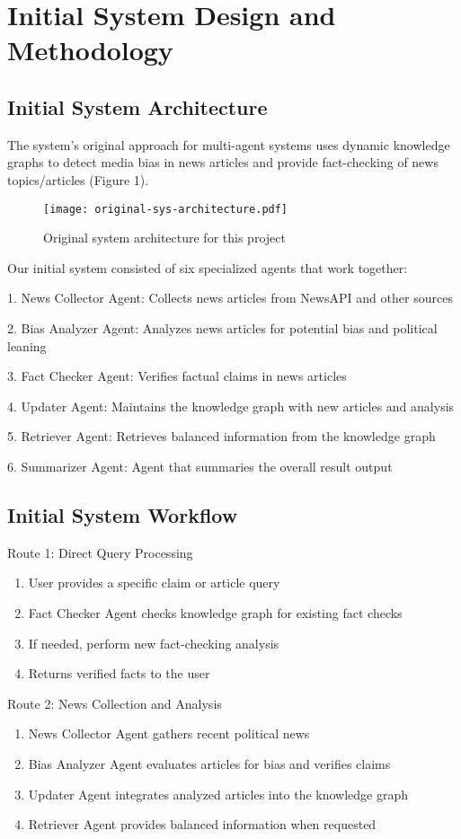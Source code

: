 \documentclass{scrartcl}
\begin{document}
\section{Initial System Design and  Methodology}
\subsection{Initial System Architecture}
The system's original approach for multi-agent systems uses dynamic knowledge graphs to detect media bias in news articles and provide fact-checking of news topics/articles (Figure 1).

\begin{figure}
    \centering
    \texttt{[image: original-sys-architecture.pdf]}
    \caption{Original system architecture for this project }
    \label{fig:enter-label}
\end{figure}
Our initial system consisted of six specialized agents that work together:

1. News Collector Agent: Collects news articles from NewsAPI and other sources

2. Bias Analyzer Agent: Analyzes news articles for potential bias and political leaning

3. Fact Checker Agent: Verifies factual claims in news articles

4. Updater Agent: Maintains the knowledge graph with new articles and analysis

5. Retriever Agent: Retrieves balanced information from the knowledge graph

6. Summarizer Agent: Agent that summaries the overall result output

\subsection{Initial System Workflow}
Route 1: Direct Query Processing

\begin{enumerate}
    \item User provides a specific claim or article query
    \item Fact Checker Agent checks knowledge graph for existing fact checks
    \item If needed, perform new fact-checking analysis
    \item Returns verified facts to the user
\end{enumerate}

Route 2: News Collection and Analysis
\begin{enumerate}
    \item News Collector Agent gathers recent political news
    \item Bias Analyzer Agent evaluates articles for bias and verifies claims
    \item Updater Agent integrates analyzed articles into the knowledge graph
    \item Retriever Agent provides balanced information when requested
\end{enumerate}
\end{document}
